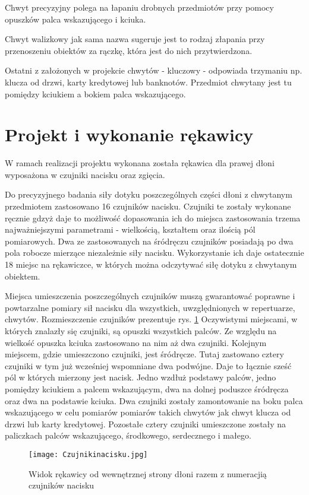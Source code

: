 \documentclass[10pt, a4paper]{article}
\begin{document}
Chwyt precyzyjny polega na łapaniu drobnych przedmiotów przy pomocy opuszków palca wskazującego i kciuka.

Chwyt walizkowy jak sama nazwa sugeruje jest to rodzaj złapania przy przenoszeniu obiektów za rączkę, która jest do nich przytwierdzona.

Ostatni z założonych w projekcie chwytów - kluczowy - odpowiada trzymaniu np. klucza od drzwi, karty kredytowej lub banknotów. Przedmiot chwytany jest tu pomiędzy kciukiem a bokiem palca wskazującego.

\section{Projekt i wykonanie rękawicy}
\label{sec:rekawica}
W ramach realizacji projektu wykonana została rękawica dla prawej dłoni wyposażona w czujniki nacisku oraz zgięcia.

Do precyzyjnego badania siły dotyku poszczególnych części dłoni z chwytanym przedmiotem zastosowano 16 czujników nacisku. Czujniki te zostały wykonane ręcznie gdzyż daje to możliwość dopasowania ich do miejsca zastosowania trzema najważniejszymi parametrami - wielkością, kształtem oraz ilością pól pomiarowych. Dwa ze zastosowanych na śródręczu czujników posiadają po dwa pola robocze mierzące niezależnie siły nacisku. Wykorzystanie ich daje ostatecznie 18 miejsc na rękawiczce, w których można odczytywać siłę dotyku z chwytanym obiektem. 

Miejsca umieszczenia poszczególnych czujników muszą gwarantować poprawne i powtarzalne pomiary sił nacisku dla wszystkich, uwzględnionych w repertuarze, chwytów. Rozmieszczenie czujników prezentuje rys. \ref{dol}
Oczywistymi miejscami, w których znalazły się czujniki, są opuszki wszystkich palców. Ze względu na wielkość opuszka kciuka zastosowano na nim aż dwa czujniki. Kolejnym miejscem, gdzie umieszczono czujniki, jest śródręcze. Tutaj zastowano cztery czujniki w tym już wcześniej wspomniane dwa podwójne. Daje to łącznie sześć pól w których mierzony jest nacisk. Jedno wzdłuż podstawy palców, jedno pomiędzy kciukiem a palcem wskazującym, dwa na dolnej poduszce śródręcza oraz dwa na podstawie kciuka. Dwa czujniki zostały zamontowanie na boku palca wskazującego w celu pomiarów pomiarów takich chwytów jak chwyt klucza od drzwi lub karty kredytowej. Pozostałe cztery czujniki umieszczone zostały na paliczkach palców wskazującego, środkowego, serdecznego i małego.
	

\begin{figure}[h!]
\texttt{[image: Czujnikinacisku.jpg]}

\caption{Widok rękawicy od wewnętrznej strony dłoni razem z numeracjią czujników nacisku} \label{dol}
\end{figure}
\end{document}
